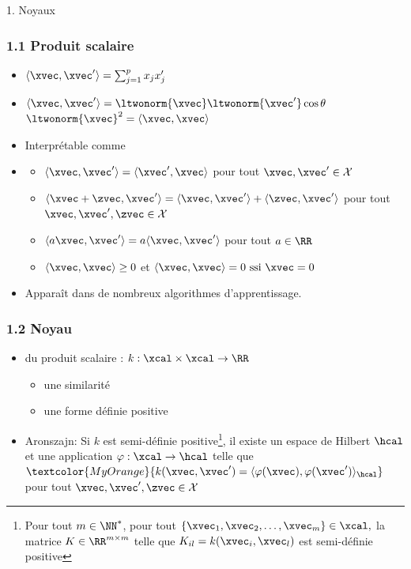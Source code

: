 \begin{frame}
  \begin{center}
    \large{1. Noyaux}
  \end{center}
\end{frame}

\begin{frame}
  \frametitle{1.1 Produit scalaire}
  \begin{itemize}
  \item $\langle \xvec, \xvec^\prime \rangle = \sum_{j=1}^p x_j x_j^\prime$
  \item $\langle \xvec, \xvec^\prime \rangle = \ltwonorm{\xvec} \ltwonorm{\xvec^\prime} \cos \theta$ \hspace{1em}
     $\ltwonorm{\xvec}^2 = \langle \xvec, \xvec \rangle$
  \item Interprétable comme 
  \item {}
    \begin{itemize}
    \item $\langle \xvec, \xvec^\prime \rangle = \langle \xvec^\prime, \xvec \rangle$
      pour tout $\xvec, \xvec^\prime \in \mathcal{X}$
    \item $\langle \xvec + \zvec, \xvec^\prime \rangle = \langle \xvec, \xvec^\prime \rangle +
      \langle \zvec, \xvec^\prime \rangle$       pour tout $\xvec, \xvec^\prime, \zvec \in \mathcal{X}$
    \item $\langle a \xvec, \xvec^\prime \rangle = a \langle \xvec, \xvec^\prime \rangle$ pour tout $a \in \RR$
    \item $\langle \xvec, \xvec \rangle \geq 0$ et $\langle \xvec, \xvec \rangle = 0 \text{ ssi } \xvec = 0$
    \end{itemize}
  \item Apparaît dans de nombreux algorithmes d'apprentissage.
  \end{itemize}
\end{frame}

\begin{frame}
  \frametitle{1.2 Noyau}
  \begin{itemize}
  \item {} du produit scalaire : $k: \xcal \times \xcal \rightarrow \RR$
    \begin{itemize}
    \item {} une similarité
    \item {} une forme définie positive 
    \end{itemize}
  \item Aronszajn: Si $k$ est semi-définie positive\footnote{Pour tout
      $m \in \NN^*$, pour tout
      $\{\xvec_1, \xvec_2, \dots, \xvec_m\} \in \xcal,$ la matrice
      $K \in \RR^{m \times m}$ telle que $K_{il} = k(\xvec_i, \xvec_l)$ est
      semi-définie positive}, il existe un espace de Hilbert $\hcal$ et une application
    $\varphi: \xcal \rightarrow \hcal$ telle que
    $\textcolor{MyOrange}{k(\xvec, \xvec^\prime) = \langle \varphi(\xvec), \varphi(\xvec^\prime)\rangle_{\hcal}}$
    pour tout $\xvec, \xvec^\prime, \zvec \in \mathcal{X}$
  \end{itemize}
\end{frame}

